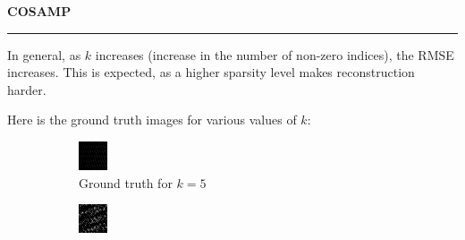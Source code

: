\documentclass[a4paper,12pt]{article}
\newenvironment{solution}[2][]{%
    \begin{mdframed}[linecolor=blue!70!black, linewidth=2pt, roundcorner=10pt, backgroundcolor=yellow!10!white, skipabove=12pt, skipbelow=12pt]%
        \textbf{\large #2}
        \par\noindent\rule{\textwidth}{0.4pt}
}{
    \end{mdframed}
}
\begin{document}
\begin{solution}{COSAMP}
    
    In general, as $k$ increases (increase in the number of non-zero indices), the RMSE increases. This is expected, as a higher sparsity level makes reconstruction harder.
    
    Here is the ground truth images for various values of $k$:
    
    \begin{figure}[H]
      \centering
      \begin{subfigure}[t]{0.32\textwidth}
          \centering
          \includegraphics[width=\textwidth]{../images/cosamp/Ground_Truth_k_5.png}
          \caption{Ground truth for $k = 5$}
      \end{subfigure}
      \begin{subfigure}[t]{0.32\textwidth}
          \centering
          \includegraphics[width=\textwidth]{../images/cosamp/Ground_truth_k_50.png}

\end{subfigure}
\end{figure}
\end{solution}
\end{document}
